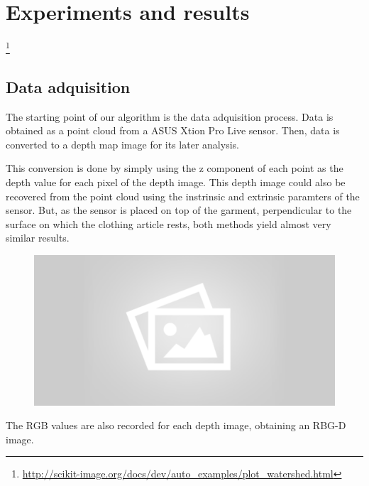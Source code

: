 \chapter{Experiments and results}
\label{experiments_and_results}



\footnote{\url{http://scikit-image.org/docs/dev/auto_examples/plot_watershed.html}} 

\section{Data adquisition}
\label{data_adquisition}

The starting point of our algorithm is the data adquisition process. Data is obtained as a point cloud from a ASUS Xtion Pro Live sensor. Then, data is converted to a depth map image for its later analysis. 

This conversion is done by simply using the z component of each point as the depth value for each pixel of the depth image. This depth image could also be recovered from the point cloud using the instrinsic and extrinsic paramters of the sensor. But, as the sensor is placed on top of the garment, perpendicular to the surface on which the clothing article rests, both methods yield almost very similar results.

\begin{figure}[thpb]
    \centering
    \includegraphics[width=0.7
    \textwidth]{figures/placeholder2.png}
    \caption{}
    \label{fig:point_cloud_and_depth_image}
\end{figure}

The RGB values are also recorded for each depth image, obtaining an RBG-D image.



